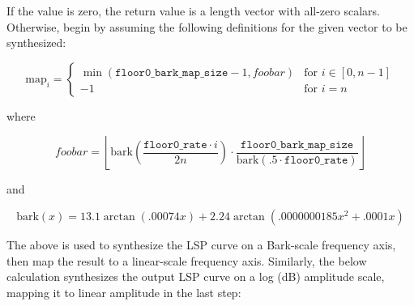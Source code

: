 If the value \varname{[amplitude]} is zero, the return value is a
length \varname{[n]} vector with all-zero scalars.  Otherwise, begin by
assuming the following definitions for the given vector to be
synthesized:

   \begin{displaymath}
     \mathrm{map}_i = \left\{
       \begin{array}{ll}
          \min (
            \mathtt{floor0\texttt{\_}bark\texttt{\_}map\texttt{\_}size} - 1,
            foobar
          ) & \textrm{for } i \in [0,n-1] \\
          -1 & \textrm{for } i = n
        \end{array}
      \right.
    \end{displaymath}

    where

    \begin{displaymath}
    foobar =
      \left\lfloor
        \mathrm{bark}\left(\frac{\mathtt{floor0\texttt{\_}rate} \cdot i}{2n}\right) \cdot \frac{\mathtt{floor0\texttt{\_}bark\texttt{\_}map\texttt{\_}size}} {\mathrm{bark}(.5 \cdot \mathtt{floor0\texttt{\_}rate})}
      \right\rfloor
    \end{displaymath}

    and

    \begin{displaymath}
      \mathrm{bark}(x) = 13.1 \arctan (.00074x) + 2.24 \arctan (.0000000185x^2 + .0001x)
    \end{displaymath}

The above is used to synthesize the LSP curve on a Bark-scale frequency
axis, then map the result to a linear-scale frequency axis.
Similarly, the below calculation synthesizes the output LSP curve \varname{[output]} on a log
(dB) amplitude scale, mapping it to linear amplitude in the last step:

